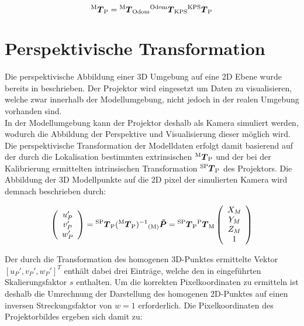 \begin{equation}
{^{\mathrm{M}}\mbox{\boldmath{$T$}}_{\mathrm{P}}} = {^{\mathrm{M}}\mbox{\boldmath{$T$}}_{\mathrm{Odom}}}{^{\mathrm{Odom}}\mbox{\boldmath{$T$}}_{\mathrm{KPS}}}{^{\mathrm{KPS}}\mbox{\boldmath{$T$}}_{\mathrm{P}}}
\end{equation}

\section{Perspektivische Transformation}
Die perspektivische Abbildung einer 3D Umgebung auf eine 2D Ebene wurde bereits in  beschrieben. Der Projektor wird eingesetzt um Daten zu visualisieren, welche zwar innerhalb der Modellumgebung, nicht jedoch in der realen Umgebung vorhanden sind.\\
In der Modellumgebung kann der Projektor deshalb als Kamera simuliert werden, wodurch die Abbildung der Perspektive und Visualisierung dieser möglich wird. Die perspektivische Transformation der Modelldaten erfolgt damit basierend auf der durch die Lokalisation bestimmten extrinsischen ${^{\mathrm{M}}\mbox{\boldmath{$T$}}_{\mathrm{P}}}$ und der bei der Kalibrierung ermittelten intrinsischen Transformation ${^{\mathrm{SP}}\mbox{\boldmath{$T$}}_{\mathrm{P}}}$ des Projektors. Die Abbildung der 3D Modellpunkte auf die 2D pixel der simulierten Kamera wird demnach beschrieben durch:

\begin{equation}
\left(\begin{array}{c}
u_P'\\
v_P'\\
w_P'
\end{array}\right)
= {^{\mathrm{SP}}\mbox{\boldmath{$T$}}_{\mathrm{P}}}({^{\mathrm{M}}\mbox{\boldmath{$T$}}_{\mathrm{P}}})^{-1}{_{{\mathrm{(M)}}}}\mbox{\boldmath{$\tilde{P}$}} = {^{\mathrm{SP}}\mbox{\boldmath{$T$}}_{\mathrm{P}}}{^{\mathrm{P}}\mbox{\boldmath{$T$}}_{\mathrm{M}}} \left(\begin{array}{c}
X_M\\
Y_M\\
Z_M\\
1
\end{array} \right)
\label{eq.proj_trans}
\end{equation}

Der durch die Transformation des homogenen 3D-Punktes ermittelte Vektor $[u_P',v_P',w_P']^T$ enthält dabei drei Einträge, welche den in  eingeführten Skalierungsfaktor $s$ enthalten. Um die korrekten Pixelkoordinaten zu ermitteln ist deshalb die Umrechnung der Darstellung des homogenen 2D-Punktes auf einen inversen Streckungsfaktor von $w=1$ erforderlich. Die Pixelkoordinaten des Projektorbildes ergeben sich damit zu:

